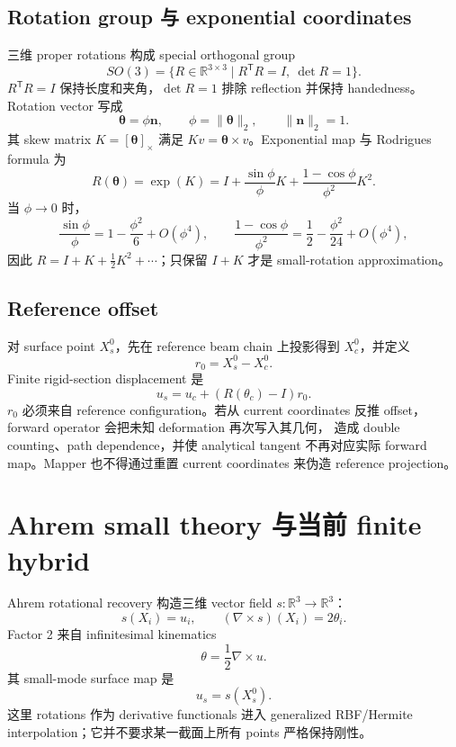 \documentclass[11pt,a4paper]{article}
\newcommand{\RR}{\mathbb{R}}
\newcommand{\T}{\mathsf{T}}
\newcommand{\curl}{\nabla\times}
\begin{document}
\subsection{Rotation group 与 exponential coordinates}

三维 proper rotations 构成 special orthogonal group
\[
 SO(3)=\{R\in\RR^{3\times3}\mid R^\T R=I,\ \det R=1\}.
\]
$R^\T R=I$ 保持长度和夹角，$\det R=1$ 排除 reflection 并保持
handedness。Rotation vector 写成
\[
 \boldsymbol\theta=\phi\boldsymbol n,\qquad
 \phi=\|\boldsymbol\theta\|_2,\qquad \|\boldsymbol n\|_2=1.
\]
其 skew matrix $K=[\boldsymbol\theta]_\times$ 满足
$K v=\boldsymbol\theta\times v$。Exponential map 与 Rodrigues formula 为
\[
 R(\boldsymbol\theta)
 =\exp(K)
 =I+\frac{\sin\phi}{\phi}K
   +\frac{1-\cos\phi}{\phi^2}K^2.
\]
当 $\phi\rightarrow0$ 时，
\[
 \frac{\sin\phi}{\phi}=1-\frac{\phi^2}{6}+O(\phi^4),\qquad
 \frac{1-\cos\phi}{\phi^2}=\frac12-\frac{\phi^2}{24}+O(\phi^4),
\]
因此 $R=I+K+\frac12K^2+\cdots$；只保留 $I+K$ 才是
small-rotation approximation。

\subsection{Reference offset}

对 surface point $X_s^0$，先在 reference beam chain 上投影得到
$X_c^0$，并定义
\[
 r_0=X_s^0-X_c^0.
\]
Finite rigid-section displacement 是
\[
 u_s=u_c+\left(R(\theta_c)-I\right)r_0.
\]
$r_0$ 必须来自 reference configuration。若从 current coordinates
反推 offset，forward operator 会把未知 deformation 再次写入其几何，
造成 double counting、path dependence，并使 analytical tangent
不再对应实际 forward map。Mapper 也不得通过重置 current coordinates
来伪造 reference projection。

\section{Ahrem small theory 与当前 finite hybrid}

Ahrem rotational recovery 构造三维 vector field $s:\RR^3\to\RR^3$：
\[
 s(X_i)=u_i,\qquad
 (\curl s)(X_i)=2\theta_i.
\]
Factor 2 来自 infinitesimal kinematics
\[
 \theta=\frac12\curl u.
\]
其 small-mode surface map 是
\[
 u_s=s(X_s^0).
\]
这里 rotations 作为 derivative functionals 进入 generalized
RBF/Hermite interpolation；它并不要求某一截面上所有 points
严格保持刚性。
\end{document}
